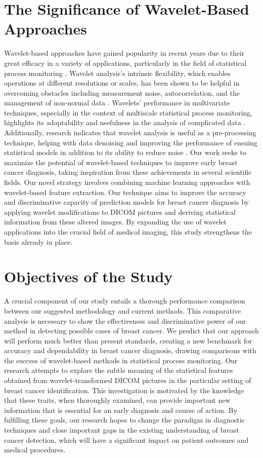 \section{The Significance of Wavelet-Based Approaches}
Wavelet-based approaches have gained popularity in recent years due to their great efficacy in a variety of applications, particularly in the field of statistical process monitoring \cite{WaveletStatistics}. Wavelet analysis's intrinsic flexibility, which enables operations at different resolutions or scales, has been shown to be helpful in overcoming obstacles including measurement noise, autocorrelation, and the management of non-normal data \cite{WaveletStatistics}. Wavelets' performance in multivariate techniques, especially in the context of multiscale statistical process monitoring, highlights its adaptability and usefulness in the analysis of complicated data \cite{WaveletStatistics}. Additionally, research indicates that wavelet analysis is useful as a pre-processing technique, helping with data denoising and improving the performance of ensuing statistical models in addition to its ability to reduce noise \cite{Michael2006}.
\newline Our work seeks to maximize the potential of wavelet-based techniques to improve early breast cancer diagnosis, taking inspiration from these achievements in several scientific fields. Our novel strategy involves combining machine learning approaches with wavelet-based feature extraction. Our technique aims to improve the accuracy and discriminative capacity of prediction models for breast cancer diagnosis by applying wavelet modifications to DICOM pictures and deriving statistical information from these altered images. By expanding the use of wavelet applications into the crucial field of medical imaging, this study strengthens the basis already in place.
\section{Objectives of the Study}
A crucial component of our study entails a thorough performance comparison between our suggested methodology and current methods. This comparative analysis is necessary to show the effectiveness and discriminative power of our method in detecting possible cases of breast cancer. We predict that our approach will perform much better than present standards, creating a new benchmark for accuracy and dependability in breast cancer diagnosis, drawing comparisons with the success of wavelet-based methods in statistical process monitoring.
\newline Our research attempts to explore the subtle meaning of the statistical features obtained from wavelet-transformed DICOM pictures in the particular setting of breast cancer identification. This investigation is motivated by the knowledge that these traits, when thoroughly examined, can provide important new information that is essential for an early diagnosis and course of action. By fulfilling these goals, our research hopes to change the paradigm in diagnostic techniques and close important gaps in the existing understanding of breast cancer detection, which will have a significant impact on patient outcomes and medical procedures.